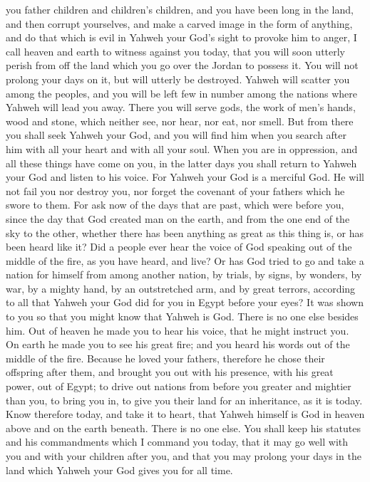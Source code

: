you father children and children's children, and you have been long in
the land, and then corrupt yourselves, and make a carved image in the
form of anything, and do that which is evil in Yahweh your God's sight
to provoke him to anger,  I call heaven and earth to
witness against you today, that you will soon utterly perish from off
the land which you go over the Jordan to possess it. You will not
prolong your days on it, but will utterly be destroyed. 
Yahweh will scatter you among the peoples, and you will be left few in
number among the nations where Yahweh will lead you away. 
There you will serve gods, the work of men's hands, wood and stone,
which neither see, nor hear, nor eat, nor smell.  But from
there you shall seek Yahweh your God, and you will find him when you
search after him with all your heart and with all your soul.
 When you are in oppression, and all these things have come
on you, in the latter days you shall return to Yahweh your God and
listen to his voice.  For Yahweh your God is a merciful
God. He will not fail you nor destroy you, nor forget the covenant of
your fathers which he swore to them.  For ask now of the
days that are past, which were before you, since the day that God
created man on the earth, and from the one end of the sky to the other,
whether there has been anything as great as this thing is, or has been
heard like it?  Did a people ever hear the voice of God
speaking out of the middle of the fire, as you have heard, and live?
 Or has God tried to go and take a nation for himself from
among another nation, by trials, by signs, by wonders, by war, by a
mighty hand, by an outstretched arm, and by great terrors, according to
all that Yahweh your God did for you in Egypt before your eyes?
 It was shown to you so that you might know that Yahweh is
God. There is no one else besides him.  Out of heaven he
made you to hear his voice, that he might instruct you. On earth he made
you to see his great fire; and you heard his words out of the middle of
the fire.  Because he loved your fathers, therefore he
chose their offspring after them, and brought you out with his presence,
with his great power, out of Egypt;  to drive out nations
from before you greater and mightier than you, to bring you in, to give
you their land for an inheritance, as it is today.  Know
therefore today, and take it to heart, that Yahweh himself is God in
heaven above and on the earth beneath. There is no one else.
 You shall keep his statutes and his commandments which I
command you today, that it may go well with you and with your children
after you, and that you may prolong your days in the land which Yahweh
your God gives you for all time.

